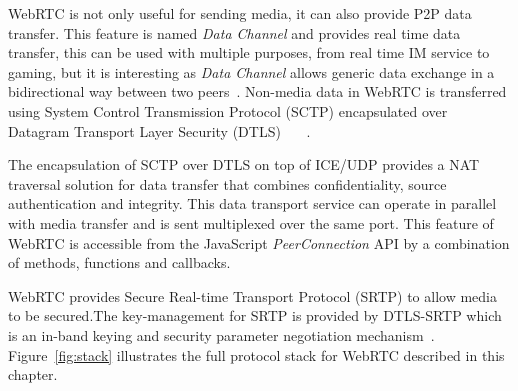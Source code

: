 
WebRTC is not only useful for sending media, it can also provide P2P data transfer. This feature is named {\it Data Channel} and provides real time data transfer, this can be used with multiple purposes, from real time IM service to gaming, but it is interesting as {\it Data Channel} allows generic data exchange in a bidirectional way between two peers~\cite{datachanIETF}. Non-media data in WebRTC is transferred using System Control Transmission Protocol (SCTP)  encapsulated over Datagram Transport Layer Security (DTLS) ~\cite{sctpIETF}~\cite{dtlsIETF}~\cite{datachanIETF}. 

The encapsulation of SCTP over DTLS on top of ICE/UDP provides a NAT traversal solution for data transfer that combines confidentiality, source authentication and integrity. This data transport service can operate in parallel with media transfer and is sent multiplexed over the same port. This feature of WebRTC is accessible from the JavaScript {\it PeerConnection} API by a combination of methods, functions and callbacks. 


WebRTC provides Secure Real-time Transport Protocol (SRTP)  to allow media to be secured.The key-management for SRTP is provided by DTLS-SRTP which is an in-band keying and security parameter negotiation mechanism~\cite{salvatore}. Figure~\ref{fig:stack} illustrates the full protocol stack for WebRTC described in this chapter.

